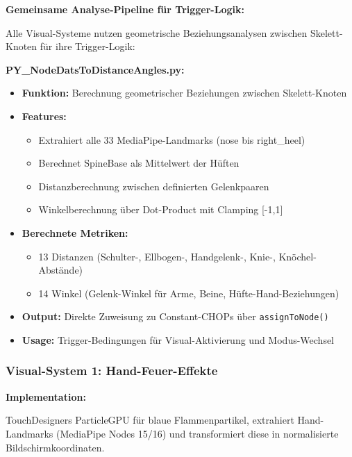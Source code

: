 \textbf{Gemeinsame Analyse-Pipeline für Trigger-Logik:}

\raggedright Alle Visual-Systeme nutzen geometrische Beziehungsanalysen zwischen Skelett-Knoten für ihre Trigger-Logik:

\textbf{PY\_NodeDatsToDistanceAngles.py:}
\begin{itemize}
    \item \textbf{Funktion:} Berechnung geometrischer Beziehungen zwischen Skelett-Knoten
    \item \textbf{Features:}
    \begin{itemize}
        \item Extrahiert alle 33 MediaPipe-Landmarks (nose bis right\_heel)
        \item Berechnet SpineBase als Mittelwert der Hüften
        \item Distanzberechnung zwischen definierten Gelenkpaaren
        \item Winkelberechnung über Dot-Product mit Clamping [-1,1]
    \end{itemize}
    \item \textbf{Berechnete Metriken:}
    \begin{itemize}
        \item 13 Distanzen (Schulter-, Ellbogen-, Handgelenk-, Knie-, Knöchel-Abstände)
        \item 14 Winkel (Gelenk-Winkel für Arme, Beine, Hüfte-Hand-Beziehungen)
    \end{itemize}
    \item \textbf{Output:} Direkte Zuweisung zu Constant-CHOPs über \texttt{assignToNode()}
    \item \textbf{Usage:} Trigger-Bedingungen für Visual-Aktivierung und Modus-Wechsel
\end{itemize}

\subsubsection{Visual-System 1: Hand-Feuer-Effekte}


\textbf{Implementation:} \raggedright TouchDesigners ParticleGPU für blaue Flammenpartikel, extrahiert Hand-Landmarks (MediaPipe Nodes 15/16) und transformiert diese in normalisierte Bildschirmkoordinaten.

